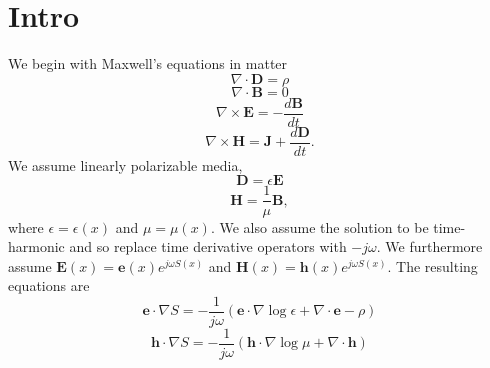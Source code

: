 \documentclass{article}
\theoremstyle{plain}
\begin{document}
\section{Intro}\label{sec:intro}

We begin with Maxwell's equations in matter
\begin{equation}
	\nabla\cdot\mathbf{D} = \rho
\end{equation}
\begin{equation}
	\nabla\cdot\mathbf{B} = 0
\end{equation}
\begin{equation}
	\nabla\times\mathbf{E} = -\frac{d\mathbf{B}}{dt}
\end{equation}
\begin{equation}
	\nabla\times\mathbf{H} = \mathbf{J} + \frac{d\mathbf{D}}{dt}.
\end{equation}
We assume linearly polarizable media,
\begin{equation}
	\mathbf{D} = \epsilon\mathbf{E}
\end{equation}
\begin{equation}
	\mathbf{H} = \frac{1}{\mu}\mathbf{B},
\end{equation}
where $\epsilon=\epsilon(x)$ and $\mu=\mu(x)$. We also assume the solution to be time-harmonic and so replace time derivative operators with $-j\omega$. We furthermore assume $\mathbf{E}(x) = \mathbf{e}(x)e^{j\omega S(x)}$ and $\mathbf{H}(x) = \mathbf{h}(x)e^{j\omega S(x)}$. The resulting equations are
\begin{equation}\label{eq:max1}
	\mathbf{e}\cdot\nabla S = -\frac{1}{j\omega}\left( \mathbf{e}\cdot\nabla\log{\epsilon} + \nabla\cdot\mathbf{e}-\rho \right)
\end{equation}
\begin{equation}\label{eq:max2}
	\mathbf{h}\cdot\nabla S = -\frac{1}{j\omega}\left( \mathbf{h}\cdot\nabla\log{\mu} + \nabla\cdot\mathbf{h}\right)
\end{equation}
\end{document}
